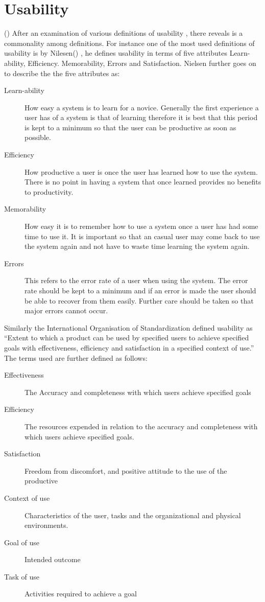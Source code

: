 \documentclass[a4paper,oneside,11pt]{report}
\begin{document}
\section{Usability}(\citeyear{test}) 
After an examination of various definitions of usability , there reveals is a commonality among definitions. 
For instance one of the most used definitions of usability is by Nilesen(\citeyear{nielsens1993}) , he defines usability in terms of five attributes Learn-ability, Efficiency. Memorability, Errors and Satisfaction. Nielsen further goes on to describe the the five attributes as:
\begin{description}
  \item[Learn-ability] How easy a system is to learn for a novice. Generally the first experience a user has of a system is that of learning therefore it is best that this period is kept to a minimum so that the user can be productive as soon as possible.
  \item[Efficiency] How productive a user is once the user has learned how to use the system. There is no point in having a system that once learned provides no benefits to productivity.
  \item[Memorability] How easy it is to remember how to use a system once a user has had some time to use it.  It is important so that an casual user may come back to use the system again and not have to waste time learning the system again.
  \item[Errors] This refers to the error rate of a user when using the system. The error rate should be kept to a minimum and if an error is made the user should be able to recover from them easily. Further care should be taken so that major errors cannot occur.
\end{description}

Similarly the International Organisation of Standardization \autocite{ISO9241-11} defined usability as \enquote {Extent to which a product can be used by specified users to achieve specified goals with effectiveness, efficiency and satisfaction in a specified context of use.} 
The terms used are further defined as follows:

\begin{description}
  \item[Effectiveness] The Accuracy and completeness with which users achieve specified goals
  \item[Efficiency] The resources expended in relation to the accuracy and completeness with which users achieve specified goals.
  \item [Satisfaction] Freedom from discomfort, and positive attitude to the use of the productive
 \item [Context of use] Characteristics of the user, tasks and the organizational and physical environments.
  \item [Goal of use] Intended outcome
  \item [Task of use] Activities required to achieve a goal
\end{description}
\end{document}
